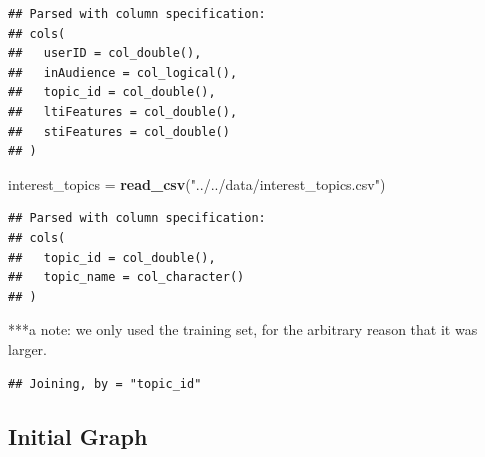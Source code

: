 \documentclass[]{article}
\newenvironment{Shaded}{\begin{snugshade}}{\end{snugshade}}
\newcommand{\DataTypeTok}[1]{\textcolor[rgb]{0.13,0.29,0.53}{#1}}
\newcommand{\KeywordTok}[1]{\textcolor[rgb]{0.13,0.29,0.53}{\textbf{#1}}}
\newcommand{\NormalTok}[1]{#1}
\newcommand{\OperatorTok}[1]{\textcolor[rgb]{0.81,0.36,0.00}{\textbf{#1}}}
\newcommand{\OtherTok}[1]{\textcolor[rgb]{0.56,0.35,0.01}{#1}}
\newcommand{\StringTok}[1]{\textcolor[rgb]{0.31,0.60,0.02}{#1}}
\begin{document}
\begin{verbatim}
## Parsed with column specification:
## cols(
##   userID = col_double(),
##   inAudience = col_logical(),
##   topic_id = col_double(),
##   ltiFeatures = col_double(),
##   stiFeatures = col_double()
## )
\end{verbatim}

\begin{Shaded}
\begin{Highlighting}[]
\NormalTok{interest_topics =}\StringTok{ }\KeywordTok{read_csv}\NormalTok{(}\StringTok{"../../data/interest_topics.csv"}\NormalTok{)}
\end{Highlighting}
\end{Shaded}

\begin{verbatim}
## Parsed with column specification:
## cols(
##   topic_id = col_double(),
##   topic_name = col_character()
## )
\end{verbatim}

***a note: we only used the training set, for the arbitrary reason that
it was larger.

\begin{Shaded}
\end{Shaded}

\begin{verbatim}
## Joining, by = "topic_id"
\end{verbatim}

\hypertarget{initial-graph}{%
\subsection{Initial Graph}\label{initial-graph}}

\begin{Shaded}
\end{Shaded}
\end{document}
